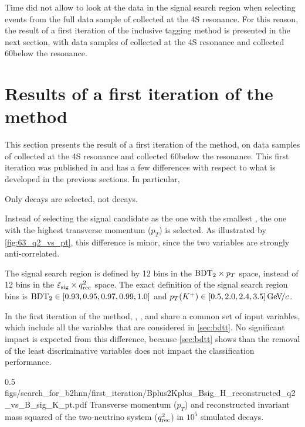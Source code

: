 Time did not allow to look at the data in the signal search region when selecting events from the full data sample of \lumion collected at the \Y4S resonance.
For this reason, the result of a first iteration of the inclusive tagging method is presented in the next section, with data samples of \lumionpartial collected at the \Y4S resonance and \lumioffpartial collected 60\mev below the resonance.

\section{Results of a first iteration of the method} \label{sec:first_iteration}

This section presents the result of a first iteration of the method, on data samples of \lumionpartial collected at the \Y4S resonance and \lumioffpartial collected 60\mev below the resonance.
This first iteration was published in \cite{Belle-II:2021rof} and has a few differences with respect to what is developed in the previous sections.
In particular,
\bi
\item Only \BKpnn decays are selected, not \BKznn decays.
\item Instead of selecting the signal candidate as the one with the smallest \qrec, the one with the highest transverse momentum ($p_T$) is selected.
As illustrated by \cref{fig:63_q2_vs_pt}, this difference is minor, since the two variables are strongly anti-correlated. 
\item The signal search region is defined by 12 bins in the $\mathrm{BDT_2}\times p_{T}$ space, instead of 12 bins in the $\tilde{\varepsilon}_{\mathrm{sig}}\times q_{\mathrm{rec}}^2$ space.
The exact definition of the signal search region bins is $\mathrm{BDT_2}\in[0.93, 0.95, 0.97, 0.99, 1.0]$ and $p_T(K^+)\in[0.5, 2.0, 2.4, 3.5]{\mathrm{\,Ge\kern -0.1em V\!/}c}$.
\item In the first iteration of the method, \bdto, \bdtt, and \bdtc share a common set of input variables, which include all the variables that are considered in \cref{sec:bdtt}.
No significant impact is expected from this difference, because \cref{sec:bdtt} shows than the removal of the least discriminative variables does not impact the classification performance.
\ei

{0.5}
{figs/search_for_b2hnn/first_iteration/Bplus2Kplus_Bsig_H_reconstructed_q2_vs_B_sig_K_pt.pdf}
{
Transverse momentum ($p_T$) and reconstructed invariant mass squared of the two-neutrino system ($q_{\mathrm{rec}}^2$) in $10^5$ simulated \BKpnn decays.
}

